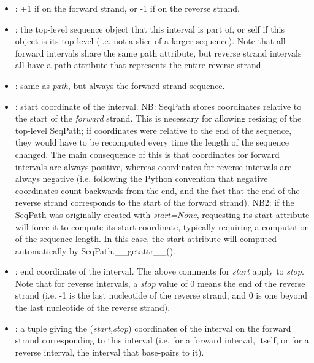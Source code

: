 \documentclass{howto}
\begin{document}
\begin{itemize}

\item    
{}: +1 if on the forward strand, or -1 if on the reverse strand.

\item
{}: the top-level sequence object that this interval is part of, or self
if this object is its top-level (i.e. not a slice of a larger sequence).  Note that
all forward intervals share the same path attribute, but reverse strand intervals
all have a path attribute that represents the entire reverse strand.

\item
{}: same as {\em path}, but always the forward strand sequence.

\item
{}: start coordinate of the interval.  NB: SeqPath stores coordinates
relative to the start of the {\em forward} strand.  This is necessary for allowing
resizing of the top-level SeqPath; if coordinates were relative to the end of the
sequence, they would have to be recomputed every time the length of the sequence 
changed.  The main consequence of this is that coordinates for forward intervals
are always positive, whereas coordinates for reverse intervals are always 
negative (i.e. following the Python convention
that negative coordinates count backwards
from the end, and the fact that the end of the reverse strand corresponds to 
the start of the forward strand). NB2: if the SeqPath was originally created with
{\em start=None}, requesting its start attribute will force it to compute its start
coordinate, typically requiring a computation of the sequence length.  In this
case, the start attribute will computed automatically by SeqPath.__getattr__().

\item
{}: end coordinate of the interval.  The above comments for {\em start}
apply to {\em stop}.  Note that for reverse intervals, a {\em stop} value of 0
means the end of the reverse strand (i.e. -1 is the last nucleotide of the 
reverse strand, and 0 is one beyond the last nucleotide of the reverse strand).

\item
{}: a tuple giving the ({\em start,stop}) coordinates of the 
interval on the forward strand corresponding to this interval (i.e. for a 
forward interval, itself, or for a reverse interval, the interval that base-pairs
to it).

\end{itemize}
\end{document}
